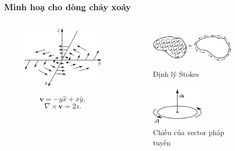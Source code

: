 \begin{frame}
    \frametitle{Minh hoạ cho dòng chảy xoáy}
    \begin{columns}
        \begin{column}{0.5\textwidth}
            \begin{figure}
                \centering
                \includegraphics[width=4cm, height=3cm]{Content/Figure/illustration for curl.jpg}
            \end{figure}
            \[\mathbf{v}=-y\hat{x}+x\hat{y},\]
            \[\nabla\times\mathbf{v}=2\hat{z}.\]
        \end{column}
        \begin{column}{0.5\textwidth}
            \begin{figure}
                \centering
                \includegraphics[width=4cm, height=2cm]{Content/Figure/illustration for Stoke.jpg}
                \caption{Định lý Stokes}
            \end{figure}
            \vspace{-8pt}

            \begin{figure}
                \centering
                \includegraphics[width=2.5cm, height=2cm]{Content/Figure/direction_of_normal_vector.jpg}
                \caption{Chiều của vector pháp tuyến}
            \end{figure}
        \end{column}
    \end{columns}
\end{frame}